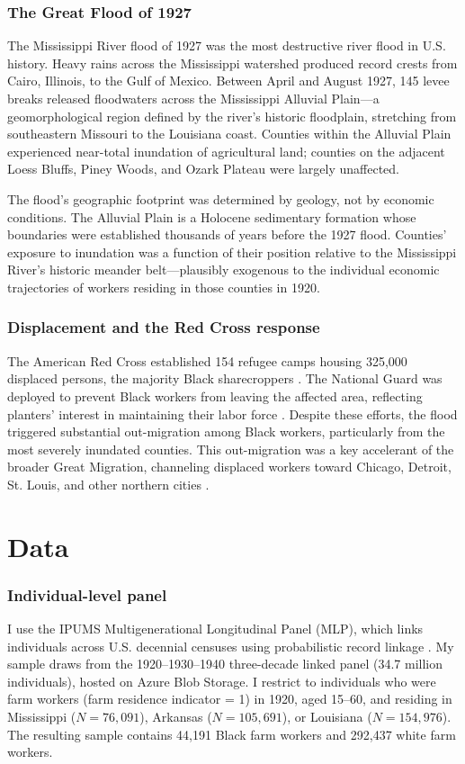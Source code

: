 \documentclass[12pt]{article}
\begin{document}
\subsubsection*{The Great Flood of 1927} The Mississippi River flood of 1927 was the most destructive river flood in U.S. history. Heavy rains across the Mississippi watershed produced record crests from Cairo, Illinois, to the Gulf of Mexico. Between April and August 1927, 145 levee breaks released floodwaters across the Mississippi Alluvial Plain---a geomorphological region defined by the river's historic floodplain, stretching from southeastern Missouri to the Louisiana coast. Counties within the Alluvial Plain experienced near-total inundation of agricultural land; counties on the adjacent Loess Bluffs, Piney Woods, and Ozark Plateau were largely unaffected.

The flood's geographic footprint was determined by geology, not by economic conditions. The Alluvial Plain is a Holocene sedimentary formation whose boundaries were established thousands of years before the 1927 flood. Counties' exposure to inundation was a function of their position relative to the Mississippi River's historic meander belt---plausibly exogenous to the individual economic trajectories of workers residing in those counties in 1920.

\subsubsection*{Displacement and the Red Cross response} The American Red Cross established 154 refugee camps housing 325,000 displaced persons, the majority Black sharecroppers \citep{barry_1997}. The National Guard was deployed to prevent Black workers from leaving the affected area, reflecting planters' interest in maintaining their labor force \citep{barry_1997}. Despite these efforts, the flood triggered substantial out-migration among Black workers, particularly from the most severely inundated counties. This out-migration was a key accelerant of the broader Great Migration, channeling displaced workers toward Chicago, Detroit, St. Louis, and other northern cities \citep{gregory_2005}.


\section{Data}

\subsubsection*{Individual-level panel} I use the IPUMS Multigenerational Longitudinal Panel (MLP), which links individuals across U.S. decennial censuses using probabilistic record linkage \citep{abramitzky_etal_2021}. My sample draws from the 1920--1930--1940 three-decade linked panel (34.7 million individuals), hosted on Azure Blob Storage. I restrict to individuals who were farm workers (farm residence indicator = 1) in 1920, aged 15--60, and residing in Mississippi ($N = 76{,}091$), Arkansas ($N = 105{,}691$), or Louisiana ($N = 154{,}976$). The resulting sample contains 44,191 Black farm workers and 292,437 white farm workers.
\end{document}
